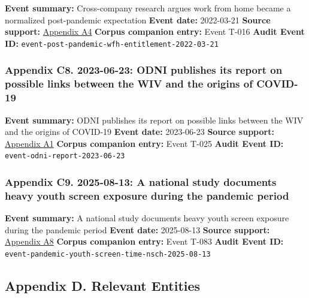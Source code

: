 \documentclass[
  american,
  11pt,
  letterpaper,
]{article}
\begin{document}
\textbf{Event summary:} Cross-company research argues work from home
became a normalized post-pandemic expectation \textbf{Event date:}
2022-03-21 \textbf{Source support:}
\hyperref[ch-03-appendix-a4-work-from-home-is-here-to-stay-call-for-flexibility-in-post-pandemic-work-policies]{Appendix
A4} \textbf{Corpus companion entry:} Event T-016 \textbf{Audit Event
ID:} \texttt{event-post-pandemic-wfh-entitlement-2022-03-21}

\subsubsection{Appendix C8. 2023-06-23: ODNI publishes its report on
possible links between the WIV and the origins of
COVID-19}\label{ch-03-appendix-c8-2023-06-23-odni-publishes-its-report-on-possible-links-between-the-wiv-and-the-origins-of-covid-19}

\textbf{Event summary:} ODNI publishes its report on possible links
between the WIV and the origins of COVID-19 \textbf{Event date:}
2023-06-23 \textbf{Source support:}
\hyperref[ch-03-appendix-a1-report-on-potential-links-between-the-wuhan-institute-of-virology-and-the-origins-of-covid-19]{Appendix
A1} \textbf{Corpus companion entry:} Event T-025 \textbf{Audit Event
ID:} \texttt{event-odni-report-2023-06-23}

\subsubsection{Appendix C9. 2025-08-13: A national study documents heavy
youth screen exposure during the pandemic
period}\label{ch-03-appendix-c9-2025-08-13-a-national-study-documents-heavy-youth-screen-exposure-during-the-pandemic-period}

\textbf{Event summary:} A national study documents heavy youth screen
exposure during the pandemic period \textbf{Event date:} 2025-08-13
\textbf{Source support:}
\hyperref[ch-03-appendix-a8-excessive-screen-time-is-associated-with-mental-health-problems-and-adhd-in-us-children-and-adolescents-physical-activity-and-sleep-as-parallel-mediators]{Appendix
A8} \textbf{Corpus companion entry:} Event T-083 \textbf{Audit Event
ID:} \texttt{event-pandemic-youth-screen-time-nsch-2025-08-13}

\subsection{Appendix D. Relevant
Entities}\label{appendix-d.-relevant-entities-3}
\end{document}
